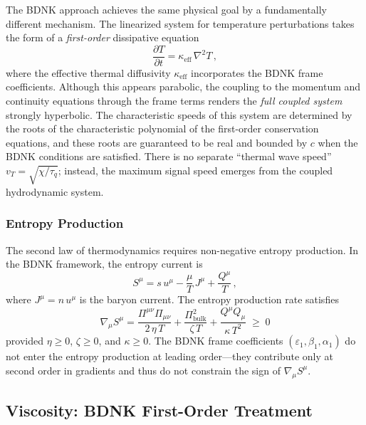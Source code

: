 The BDNK approach achieves the same physical goal by a fundamentally
different mechanism.  The linearized system for temperature
perturbations takes the form of a \emph{first-order} dissipative
equation
\begin{equation}
  \frac{\partial T}{\partial t}
  = \kappa_{\text{eff}}\,\nabla^{2}T\,,
  \label{eq:BDNK-thermal-lin}
\end{equation}
where the effective thermal diffusivity $\kappa_{\text{eff}}$
incorporates the BDNK frame coefficients.  Although this appears
parabolic, the coupling to the momentum and continuity equations
through the frame terms renders the \emph{full coupled system}
strongly hyperbolic.  The characteristic speeds of this system are
determined by the roots of the characteristic polynomial of the
first-order conservation equations, and these roots are guaranteed
to be real and bounded by $c$ when the BDNK conditions are
satisfied.  There is no separate ``thermal wave speed''
$v_{T} = \sqrt{\chi/\tau_{q}}$; instead, the maximum signal speed
emerges from the coupled hydrodynamic system.

\subsubsection{Entropy Production}
The second law of thermodynamics requires non-negative entropy
production.  In the BDNK framework, the entropy current is
\begin{equation}
  S^{\mu} = s\,u^{\mu} - \frac{\mu}{T}\,J^{\mu}
            + \frac{Q^{\mu}}{T}\,,
  \label{eq:BDNK-entropy-current}
\end{equation}
where $J^{\mu} = n\,u^{\mu}$ is the baryon current.  The entropy
production rate satisfies
\begin{equation}
  \nabla_{\mu}S^{\mu}
  = \frac{\Pi^{\mu\nu}\Pi_{\mu\nu}}{2\,\eta\,T}
    + \frac{\Pi_{\text{bulk}}^{2}}{\zeta\,T}
    + \frac{Q^{\mu}Q_{\mu}}{\kappa\,T^{2}}
  \;\ge\; 0
  \label{eq:BDNK-entropy-production}
\end{equation}
provided $\eta \ge 0$, $\zeta \ge 0$, and $\kappa \ge 0$.  The BDNK
frame coefficients $(\varepsilon_{1}, \beta_{1}, \alpha_{1})$ do not
enter the entropy production at leading order---they contribute only
at second order in gradients and thus do not constrain the sign of
$\nabla_{\mu}S^{\mu}$.


\subsection{Viscosity: BDNK First-Order Treatment}
\label{subsec:rel-viscosity}


